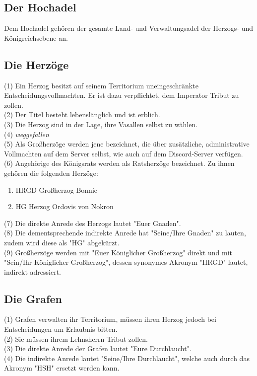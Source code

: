 \documentclass{article}
\begin{document}
\subsection{Der Hochadel}
Dem Hochadel gehören der gesamte Land- und Verwaltungsadel der Herzogs- und Königreichsebene an.

\subsection{Die Herzöge}\label{koenige} 
(1) Ein Herzog besitzt auf seinem Territorium uneingeschränkte Entscheidungsvollmachten. Er ist dazu verpflichtet, dem Imperator Tribut zu zollen.  \\
(2) Der Titel besteht lebenslänglich und ist erblich.  \\
(3) Die Herzog sind in der Lage, ihre Vasallen selbst zu wählen.  \\
(4) \textit{weggefallen}\\
(5) Als Großherzöge werden jene bezeichnet, die über zusätzliche, administrative Vollmachten auf dem Server selbst, wie auch auf dem Discord-Server verfügen.\\
(6) Angehörige des Königsrats werden als Ratsherzöge bezeichnet. Zu ihnen gehören die folgenden Herzöge:  \\
\begin{enumerate}
	\item HRGD Großherzog Bonnie
	\item HG Herzog Ordovis von Nokron  
\end{enumerate}
(7) Die direkte Anrede des Herzogs lautet "Euer Gnaden".\\
(8) Die dementsprechende indirekte Anrede hat "Seine/Ihre Gnaden" zu lauten, zudem wird diese als "HG" abgekürzt.\\
(9) Großherzöge werden mit "Euer Königlicher Großherzog" direkt und mit "Sein/Ihr Königlicher Großherzog", dessen synonymes Akronym "HRGD" lautet, indirekt adressiert.\\

\subsection{Die Grafen}
(1) Grafen verwalten ihr Territorium, müssen ihren Herzog jedoch bei Entscheidungen um Erlaubnis bitten.  \\
(2) Sie müssen ihrem Lehnsherrn Tribut zollen.  \\
(3) Die direkte Anrede der Grafen lautet "Eure Durchlaucht". \\
(4) Die indirekte Anrede lautet "Seine/Ihre Durchlaucht", welche auch durch das Akronym "HSH" ersetzt werden kann.  
\end{document}
